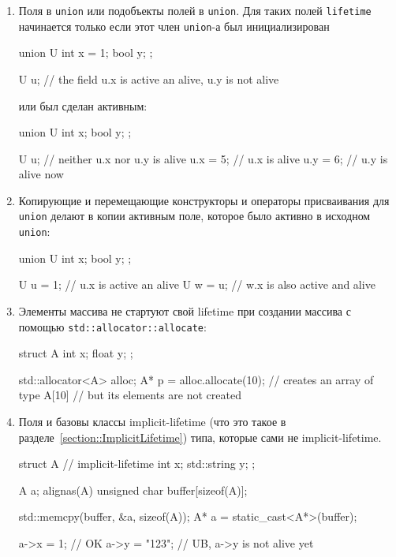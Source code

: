 \documentclass{article}
\begin{document}
\begin{enumerate}
\item Поля в \verb"union" или подобъекты полей в \verb"union".
Для таких полей \verb"lifetime" начинается только если этот член \verb"union"-а был инициализирован
\begin{cppcode}[numbers = none]
union U {
  int x = 1;
  bool y;
};

U u; // the field u.x is active an alive, u.y is not alive
\end{cppcode}
или был сделан активным:
\begin{cppcode}[numbers = none]
union U {
  int x;
  bool y;
};

U u;     // neither u.x nor u.y is alive
u.x = 5; // u.x is alive
u.y = 6; // u.y is alive now
\end{cppcode}

\item Копирующие и перемещающие конструкторы и операторы присваивания для \verb"union" делают в копии активным поле, которое было активно в исходном \verb"union":
\begin{cppcode}[numbers = none]
union U {
  int x;
  bool y;
};

U u = {1}; // u.x is active an alive
U w = u;   // w.x is also active and alive
\end{cppcode}

\item Элементы массива не стартуют свой lifetime при создании массива с помощью \verb"std::allocator::allocate":
\begin{cppcode}[numbers = none]
struct A {
  int x;
  float y;
};

std::allocator<A> alloc;
A* p = alloc.allocate(10); // creates an array of type A[10]
                           // but its elements are not created
\end{cppcode}

\item Поля и базовы классы implicit-lifetime (что это такое в разделе~\ref{section::ImplicitLifetime}) типа, которые сами не implicit-lifetime.
\begin{cppcode}[numbers = none]
struct A { // implicit-lifetime
  int x;
  std::string y;
};

A a;
alignas(A) unsigned char buffer[sizeof(A)];

std::memcpy(buffer, &a, sizeof(A));
A* a = static_cast<A*>(buffer);

a->x = 1;     // OK
a->y = "123"; // UB, a->y is not alive yet
\end{cppcode}
\end{enumerate}
\end{document}
